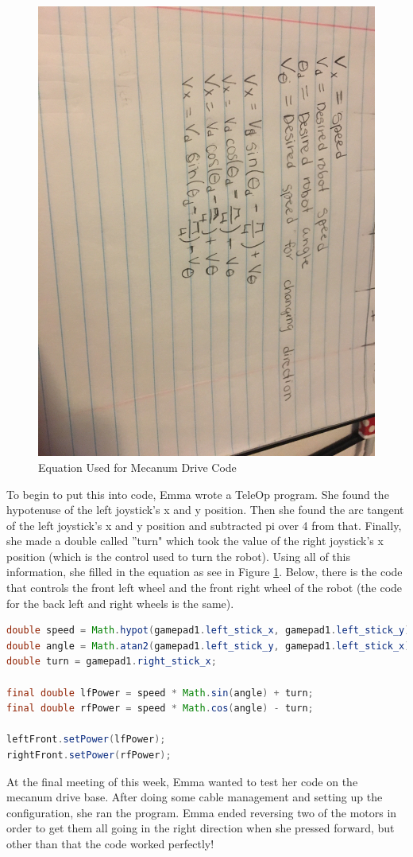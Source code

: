 \documentclass{article}
\begin{document}
\begin{figure}
    \centering
    \includegraphics[width= 0.5 \textwidth, angle=90 ] {29_03-18/images/equation.JPG}
    \caption{Equation Used for Mecanum Drive Code}
    \label{fig:equation}
\end{figure}

To begin to put this into code, Emma wrote a TeleOp program. She found the hypotenuse of the left joystick's x and y position. Then she found the arc tangent of the left joystick's x and y position and subtracted pi over 4 from that. Finally, she made a double called ''turn" which took the value of the right joystick's x position (which is the control used to turn the robot). Using all of this information, she filled in the equation as see in Figure \ref{fig:equation}. Below, there is the code that controls the front left wheel and the front right wheel of the robot (the code for the back left and right wheels is the same). \\

\newpage
\begin{lstlisting}[language=Java]
double speed = Math.hypot(gamepad1.left_stick_x, gamepad1.left_stick_y);
double angle = Math.atan2(gamepad1.left_stick_y, gamepad1.left_stick_x);
double turn = gamepad1.right_stick_x;

final double lfPower = speed * Math.sin(angle) + turn;
final double rfPower = speed * Math.cos(angle) - turn;

leftFront.setPower(lfPower);
rightFront.setPower(rfPower);
\end{lstlisting}

At the final meeting of this week, Emma wanted to test her code on the mecanum drive base. After doing some cable management and setting up the configuration, she ran the program. Emma ended reversing two of the motors in order to get them all going in the right direction when she pressed forward, but other than that the code worked perfectly! \\
\end{document}
